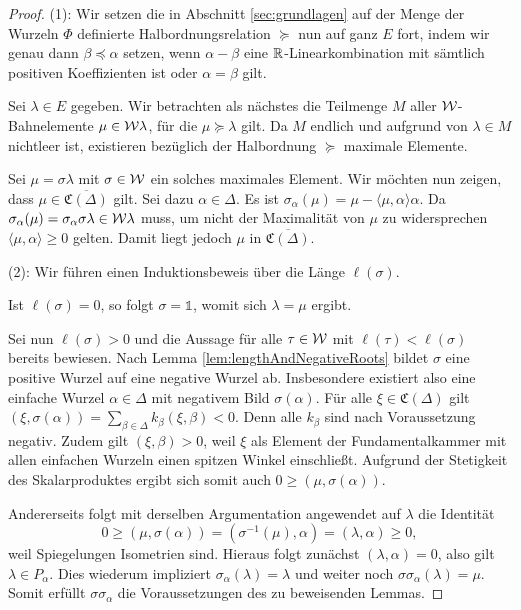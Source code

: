 \begin{proof}
  (1):
  Wir setzen die in Abschnitt \ref{sec:grundlagen} auf der Menge der Wurzeln $\Phi$ definierte Halbordnungsrelation $\succeq$ nun auf ganz $E$ fort, indem wir genau dann $\beta \preceq \alpha$ setzen, wenn $\alpha - \beta$ eine $\mathbb{R}$-Linearkombination mit sämtlich positiven Koeffizienten ist oder $\alpha = \beta$ gilt.

  Sei $\lambda \in E$ gegeben. 
  Wir betrachten als nächstes die Teilmenge $M$ aller $\mathcal{W}$\hyp{}Bahnelemente $\mu \in \mathcal{W}\lambda$, für die $\mu \succeq \lambda$ gilt.
  Da $M$ endlich und aufgrund von $\lambda \in M$ nichtleer ist, existieren bezüglich der Halbordnung $\succeq$ maximale Elemente.

  Sei $\mu = \sigma\lambda$ mit $\sigma \in \mathcal{W}$ ein solches maximales Element.
  Wir möchten nun zeigen, dass $\mu \in \overline{\mathfrak{C}(\Delta)}$ gilt.
  Sei dazu $\alpha \in \Delta$.
  Es ist $\sigma_\alpha(\mu) = \mu - \langle \mu, \alpha \rangle \alpha$.
  Da $\sigma_\alpha(\mu) = \sigma_\alpha \sigma \lambda \in \mathcal{W}\lambda$ muss, um nicht der Maximalität von $\mu$ zu widersprechen $\langle \mu, \alpha \rangle \geq 0$ gelten.
  Damit liegt jedoch $\mu$ in $\overline{\mathfrak{C}(\Delta)}$.

  (2):
  Wir führen einen Induktionsbeweis über die Länge $\ell(\sigma)$.

  Ist $\ell(\sigma) = 0$, so folgt $\sigma = \mathds{1}$, womit sich $\lambda = \mu$ ergibt.

  Sei nun $\ell(\sigma) > 0$ und die Aussage für alle $\tau \in \mathcal{W}$ mit $\ell(\tau) < \ell(\sigma)$ bereits bewiesen.
  Nach Lemma \ref{lem:lengthAndNegativeRoots} bildet $\sigma$ eine positive Wurzel auf eine negative Wurzel ab.
  Insbesondere existiert also eine einfache Wurzel $\alpha \in \Delta$ mit negativem Bild $\sigma(\alpha)$.
  Für alle $\xi \in \mathfrak{C}(\Delta)$ gilt $(\xi, \sigma(\alpha)) = \sum_{\beta \in \Delta} k_\beta (\xi,\beta) < 0$. 
  Denn alle $k_\beta$ sind nach Voraussetzung negativ.  
  Zudem gilt $(\xi,\beta) > 0$, weil $\xi$ als Element der Fundamentalkammer mit allen einfachen Wurzeln einen spitzen Winkel einschließt.
  Aufgrund der Stetigkeit des Skalarproduktes ergibt sich somit auch $0 \geq (\mu, \sigma(\alpha))$.
  
  Andererseits folgt mit derselben Argumentation angewendet auf $\lambda$ die Identität
  \begin{displaymath}
    0 \geq (\mu, \sigma(\alpha)) = (\sigma^{-1}(\mu), \alpha) = (\lambda, \alpha) \geq 0,
  \end{displaymath}
  weil Spiegelungen Isometrien sind.
  Hieraus folgt zunächst $(\lambda, \alpha) = 0$, also gilt $\lambda \in P_\alpha$.
  Dies wiederum impliziert $\sigma_\alpha(\lambda) = \lambda$ und weiter noch $\sigma \sigma_\alpha(\lambda) = \mu$.
  Somit erfüllt $\sigma \sigma_\alpha$ die Voraussetzungen des zu beweisenden Lemmas. 


\end{proof}
